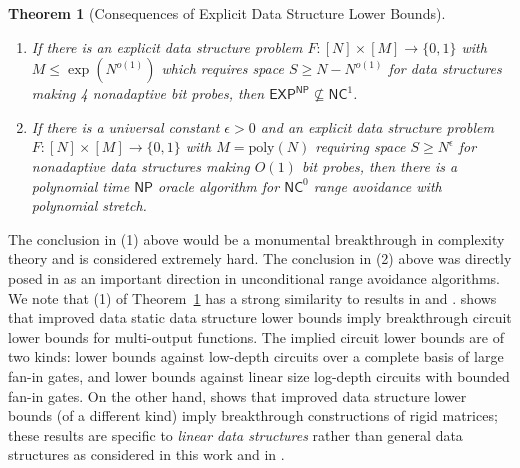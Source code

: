 \documentclass[11pt]{article}
\newtheorem{theorem}{Theorem}
\newcommand{\B}{\{0,1\}}
\newcommand{\poly}{\mathrm{poly}}
\begin{document}
\begin{theorem}[Consequences of Explicit Data Structure Lower Bounds]\label{thm:explicit-vs-avoid}
~
\begin{enumerate}
    \item If there is an explicit data structure problem $F:[N] \times [M] \to \B$ with $M \leq \exp(N^{o(1)})$ which requires space $S \geq N - N^{o(1)}$ for data structures making 4 nonadaptive bit probes, then $\mathsf{EXP^{NP}} \not\subseteq \mathsf{NC}^1$.
    \item If there is a universal constant $\epsilon>0$ and an explicit data structure problem $F:[N] \times [M] \to \B$ with $M = \poly(N)$ requiring space $S \geq N^{\epsilon}$ for nonadaptive data structures making $O(1)$ bit probes, then there is a polynomial time $\mathsf{NP}$ oracle algorithm for $\mathsf{NC}^0$ range avoidance with polynomial stretch.
\end{enumerate}
\end{theorem}

The conclusion in (1) above would be a monumental breakthrough in complexity theory and is considered extremely hard. The conclusion in (2) above was directly posed in \cite{RSW} as an important direction in unconditional range avoidance algorithms.
We note that (1) of Theorem~\ref{thm:explicit-vs-avoid} has a strong similarity to results in \cite{viola-maximal} and \cite{omri}. \cite{viola-maximal} shows that improved data static data structure lower bounds imply breakthrough circuit lower bounds for multi-output functions. The implied circuit lower bounds are of two kinds: lower bounds against low-depth circuits over a complete basis of large fan-in gates, and lower bounds against linear size log-depth circuits with bounded fan-in gates. 
On the other hand, \cite{omri} shows that improved data structure lower bounds (of a different kind) imply breakthrough constructions of rigid matrices; these results are specific to \emph{linear data structures} rather than general data structures as considered in this work and in \cite{viola-maximal}. 
\end{document}
